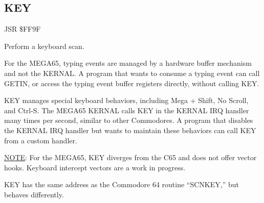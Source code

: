 
\newpage
\subsection{KEY}
\label{KERNAL Jump Table!KEY}
\begin{description}[leftmargin=2cm,style=nextline]
    \item [Address:] JSR \$FF9F
    \item [Description:] Perform a keyboard scan.
    \item [Remarks:]
        For the MEGA65, typing events are managed by a hardware buffer mechanism and not the KERNAL. A program that wants to consume a typing event can call GETIN, or access the typing event buffer registers directly, without calling KEY.

        KEY manages special keyboard behaviors, including Mega + Shift, No Scroll, and Ctrl-S. The MEGA65 KERNAL calls KEY in the KERNAL IRQ handler many times per second, similar to other Commodores. A program that disables the KERNAL IRQ handler but wants to maintain these behaviors can call KEY from a custom handler.

        \underline{NOTE}: For the MEGA65, KEY diverges from the C65 and does not offer vector hooks. Keyboard intercept vectors are a work in progress.

        KEY has the same address as the Commodore 64 routine ``SCNKEY,'' but behaves differently.
    \item [Example:]
\end{description}



\newpage
